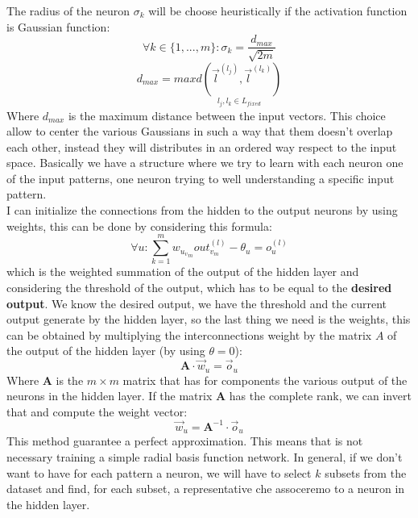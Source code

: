 \documentclass{article}
\begin{document}
The radius of the neuron $\sigma_k$ will be choose heuristically if the activation
function is Gaussian function:
$$\forall k\in\{1,...,m\}:\sigma_k = \frac{d_{max}}{\sqrt{2m}}$$
$$d_{max}=max\underset{l_j,l_k\in L_{fixed}}{d\left(\vec{l}^{(l_j)},\vec{l}^(l_k)\right)}$$
Where $d_{max}$ is the maximum distance between the input vectors.
This choice allow to center the various Gaussians in such a way that them doesn't overlap each other,
instead they will distributes in an ordered way respect to the input space.
Basically we have a structure where we try to learn with each neuron one of the input patterns,
one neuron trying to well understanding a specific input pattern.
\linebreak\\\noindent I can initialize the connections from the hidden to the output
neurons by using weights, this can be done by considering this formula:
$$\forall u:\sum_{k=1}^{m}w_{{u_v}_m} out_{v_m}^{(l)}-\theta_u=o_u^{(l)}$$
which is the weighted summation of the output of the hidden layer and considering the threshold
of the output, which has to be equal to the \textbf{desired output}. We know the desired output,
we have the threshold and the current output generate by the hidden layer, so the last thing we
need is the weights, this can be obtained by multiplying the interconnections weight by the
matrix $A$ of the output of the hidden layer (by using $\theta=0$):
$$\textbf{A}\cdot\vec{w}_u=\vec{o}_u$$
Where $\textbf{A}$ is the $m\times m$ matrix that has for components the various output of the
neurons in the hidden layer. If the matrix $\textbf{A}$ has the complete rank, we can invert that and
compute the weight vector:
$$\vec{w}_u=\textbf{A}^{-1}\cdot\vec{o}_u$$
This method guarantee a perfect approximation. This means that is not necessary training
a simple radial basis function network. In general, if we don't want to have for each pattern a neuron,
we will have to select $k$ subsets from the dataset and find, for each subset, a representative che assoceremo
to a neuron in the hidden layer.
\end{document}
